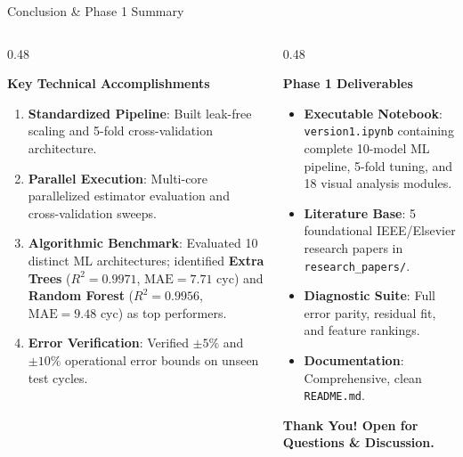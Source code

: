 \documentclass[aspectratio=169, 10pt]{beamer}
\begin{document}
\begin{frame}{Conclusion \& Phase 1 Summary}
\begin{columns}[T]
  \begin{column}{0.48\textwidth}
    \begin{block}{\textbf{Key Technical Accomplishments}}
      \footnotesize
      \begin{enumerate}
        \item \textbf{Standardized Pipeline}: Built leak-free scaling and 5-fold cross-validation architecture.
        \item \textbf{Parallel Execution}: Multi-core parallelized estimator evaluation and cross-validation sweeps.
        \item \textbf{Algorithmic Benchmark}: Evaluated 10 distinct ML architectures; identified \textbf{Extra Trees} ($R^2 = 0.9971$, $\text{MAE} = 7.71$ cyc) and \textbf{Random Forest} ($R^2 = 0.9956$, $\text{MAE} = 9.48$ cyc) as top performers.
        \item \textbf{Error Verification}: Verified $\pm 5\%$ and $\pm 10\%$ operational error bounds on unseen test cycles.
      \end{enumerate}
    \end{block}
  \end{column}

  \begin{column}{0.48\textwidth}
    \begin{block}{\textbf{Phase 1 Deliverables}}
      \footnotesize
      \begin{itemize}
        \item \textbf{Executable Notebook}: \texttt{version1.ipynb} containing complete 10-model ML pipeline, 5-fold tuning, and 18 visual analysis modules.
        \item \textbf{Literature Base}: 5 foundational IEEE/Elsevier research papers in \texttt{research\_papers/}.
        \item \textbf{Diagnostic Suite}: Full error parity, residual fit, and feature rankings.
        \item \textbf{Documentation}: Comprehensive, clean \texttt{README.md}.
      \end{itemize}
    \end{block}
    \vspace{0.4em}
    \begin{center}
      \textbf{\textcolor{NavyPrimary}{Thank You! Open for Questions \& Discussion.}}
    \end{center}
  \end{column}
\end{columns}
\end{frame}
\end{document}
